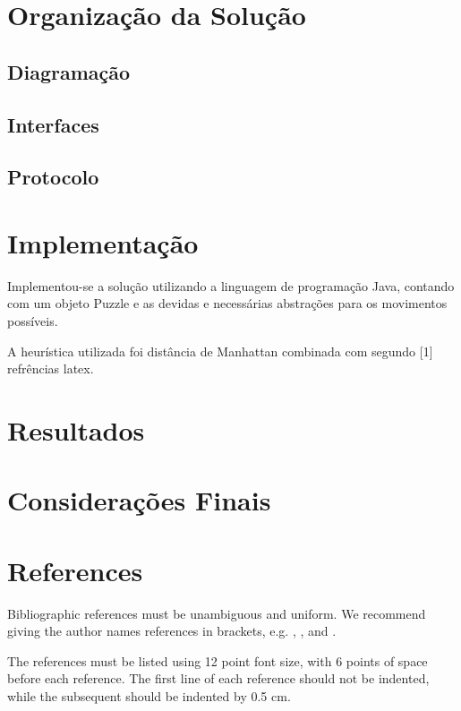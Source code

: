 \documentclass[12pt]{article}
\begin{document}
	\section{Organização da Solução}\label{sec:solucao}


		\subsection{Diagramação}\label{sec:diagramacao}


		\subsection{Interfaces}\label{sec:interfaces}


		\subsection{Protocolo}\label{sec:protocolo}


	\section{Implementação}\label{sec:implementacao}

	Implementou-se a solução utilizando a linguagem de programação Java, contando com um objeto Puzzle e as devidas e necessárias abstrações para os movimentos possíveis.

	A heurística utilizada foi distância de Manhattan combinada com segundo [1] refrências latex.

	\section{Resultados}\label{sec:resultados}	


	\section{Considerações Finais}\label{sec:consideracoesFiinais}

	\section{References}

	Bibliographic references must be unambiguous and uniform.  We recommend giving
	the author names references in brackets, e.g. \cite{knuth:84},
	\cite{boulic:91}, and \cite{smith:99}.

	The references must be listed using 12 point font size, with 6 points of space
	before each reference. The first line of each reference should not be
	indented, while the subsequent should be indented by 0.5 cm.



\end{document}
